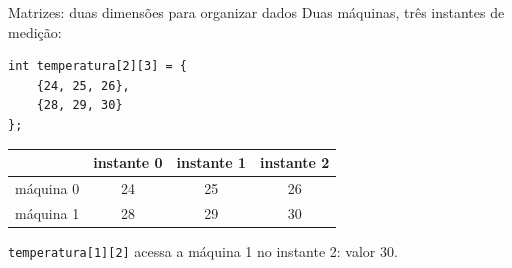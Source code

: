 \begin{frame}[fragile]{Matrizes: duas dimensões para organizar dados}
Duas máquinas, três instantes de medição:
\begin{lstlisting}
int temperatura[2][3] = {
    {24, 25, 26},
    {28, 29, 30}
};
\end{lstlisting}
\begin{center}
\begin{tabular}{c|ccc}
 & instante 0 & instante 1 & instante 2 \\
\hline
máquina 0 & 24 & 25 & 26 \\
máquina 1 & 28 & 29 & 30 \\
\end{tabular}
\end{center}
\texttt{temperatura[1][2]} acessa a máquina 1 no instante 2: valor 30.
\end{frame}
